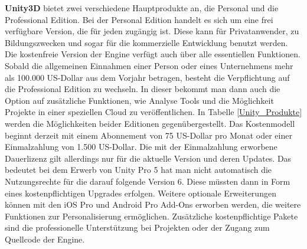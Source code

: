 \bigskip
\textbf{Unity3D} bietet zwei verschiedene Hauptprodukte an, die Personal und die Professional Edition. Bei der Personal Edition handelt es sich um eine frei verfügbare Version, die für jeden zugängig ist. Diese kann für Privatanwender, zu Bildungszwecken und sogar für die kommerzielle Entwicklung benutzt werden. Die kostenfreie Version der Engine verfügt auch über alle essentiellen Funktionen. Sobald die allgemeinen Einnahmen einer Person oder eines Unternehmens mehr als 100.000 US-Dollar aus dem Vorjahr betragen, besteht die Verpflichtung auf die Professional Edition zu wechseln. In dieser bekommt man dann auch die Option auf zusätzliche Funktionen, wie Analyse Tools und die Möglichkeit Projekte in einer speziellen Cloud zu veröffentlichen. In Tabelle \ref{Unity_Produkte} werden die Möglichkeiten beider Editionen gegenübergestellt. Das Kostenmodell beginnt derzeit mit einem Abonnement von 75 US-Dollar pro Monat oder einer Einmalzahlung von 1.500 US-Dollar. Die mit der Einmalzahlung erworbene Dauerlizenz gilt allerdings nur für die aktuelle Version und deren Updates. Das bedeutet bei dem Erwerb von Unity Pro 5 hat man nicht automatisch die Nutzungsrechte für die darauf folgende Version 6. Diese müssten dann in Form eines kostenpflichtigen Upgrades erfolgen. Weitere optionale Erweiterungen können mit den iOS Pro und Android Pro Add-Ons erworben werden, die weitere Funktionen zur Personalisierung ermöglichen. Zusätzliche kostenpflichtige Pakete sind die professionelle Unterstützung bei Projekten oder der Zugang zum Quellcode der Engine. \citep{unity_products}

